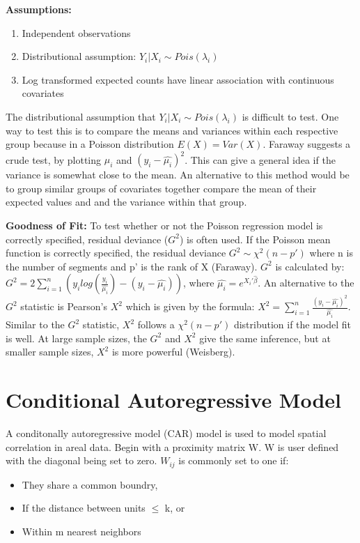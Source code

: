 \textbf{Assumptions:}
\begin{enumerate}
\item Independent observations
\item Distributional assumption: $Y_i | X_i \sim Pois(\lambda_i)$
\item Log transformed expected counts have linear association with continuous covariates
\end{enumerate}

The distributional assumption that $Y_i | X_i \sim Pois(\lambda_i)$ is difficult to test. One way to test this is to compare the means and variances within each respective group because in a Poisson distribution $E(X) = Var(X)$. Faraway suggests a crude test, by plotting $\hat{\mu_i}$ and $(y_i-\hat{\mu_i})^2$. This can give a general idea if the variance is somewhat close to the mean. An alternative to this method would be to group similar groups of covariates together compare the mean of their expected values and and the variance within that group. 

\textbf{Goodness of Fit:} To test whether or not the Poisson regression model is correctly specified, residual deviance ($G^2$) is often used. If the Poisson mean function is correctly specified, the residual deviance $G^2 \sim \chi^2(n-p')$ where n is the number of segments and p' is the rank of X (Faraway). $G^2$ is calculated by: $G^2=2\sum\limits_{i=1}^n(y_i log(\frac{y_i}{\hat{\mu_i}}) - (y_i - \hat{\mu_i}))$, where $\hat{\mu_i}=e^{X_i'\hat{\beta}}$. An alternative to the $G^2$ statistic is Pearson's $X^2$ which is given by the formula: $X^2=\sum\limits_{i=1}^n \frac{(y_i-\hat{\mu_i})^2}{\hat{\mu_i}}$. Similar to the $G^2$ statistic, $X^2$ follows a $\chi^2(n-p')$ distribution if the model fit is well. At large sample sizes, the $G^2$ and $X^2$ give the same inference, but at smaller sample sizes, $X^2$ is more powerful (Weisberg). 

\section{Conditional Autoregressive Model}
A conditonally autoregressive model (CAR) model is used to model spatial correlation in areal data. Begin with a proximity matrix W. W is user defined 
with the diagonal being set to zero. $W_{ij}$ is commonly set to one if:

\begin{itemize}
\item They share a common boundry, 
\item If the distance between units $\leq$ k, or
\item Within m nearest neighbors
\end{itemize}

